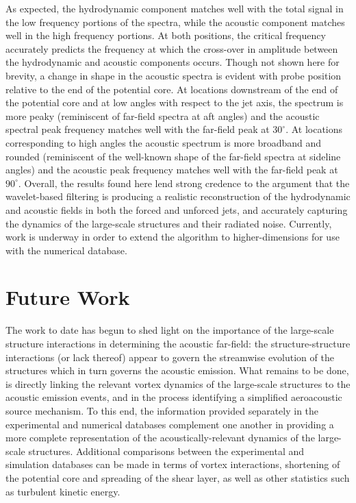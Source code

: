 \documentclass[english]{aiaa-tc}
\begin{document}
As expected, the hydrodynamic component matches well with the total
signal in the low frequency portions of the spectra, while the
acoustic component matches well in the high frequency portions. At
both positions, the critical frequency accurately predicts the
frequency at which the cross-over in amplitude between the
hydrodynamic and acoustic components occurs. Though not shown here for
brevity, a change in shape in the acoustic spectra is evident with
probe position relative to the end of the potential core. At locations
downstream of the end of the potential core and at low angles with
respect to the jet axis, the spectrum is more peaky (reminiscent of
far-field spectra at aft angles) and the acoustic spectral peak
frequency matches well with the far-field peak at $30^{\circ}$. At
locations corresponding to high angles the acoustic spectrum is more
broadband and rounded (reminiscent of the well-known shape of the
far-field spectra at sideline angles) and the acoustic peak frequency
matches well with the far-field peak at $90^{\circ}$. Overall, the
results found here lend strong credence to the argument that the
wavelet-based filtering is producing a realistic reconstruction of the
hydrodynamic and acoustic fields in both the forced and unforced jets,
and accurately capturing the dynamics of the large-scale structures
and their radiated noise. Currently, work is underway in order to
extend the algorithm to higher-dimensions for use with the numerical
database.

\section{Future Work}
The work to date has begun to shed light on the importance of the
large-scale structure interactions in determining the acoustic
far-field: the structure-structure interactions (or lack thereof)
appear to govern the streamwise evolution of the structures which in
turn governs the acoustic emission. What remains to be done, is
directly linking the relevant vortex dynamics of the large-scale
structures to the acoustic emission events, and in the process
identifying a simplified aeroacoustic source mechanism. To this end,
the information provided separately in the experimental and numerical
databases complement one another in providing a
more complete representation of the acoustically-relevant dynamics of
the large-scale structures. Additional comparisons between the
experimental and simulation databases can be made in terms of vortex
interactions, shortening of the potential core and spreading of the
shear layer, as well as other statistics such as turbulent kinetic
energy. 
\end{document}
